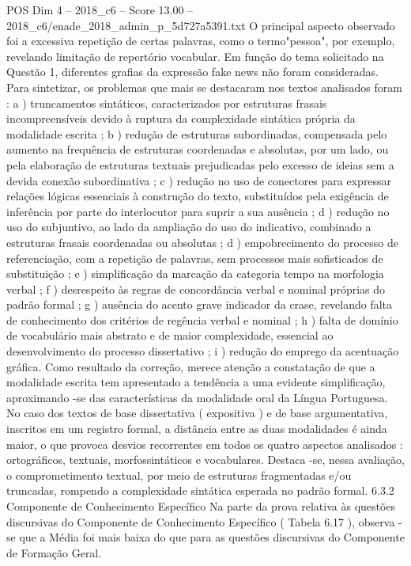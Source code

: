 \begin{textsample}{POS Dim 4 – 2018\_c6 – Score 13.00 – 2018\_c6/enade\_2018\_admin\_p\_5d727a5391.txt}
O principal aspecto observado foi a excessiva repetição de certas palavras, como o termo"pessoa", por exemplo, revelando limitação de repertório vocabular.
Em função do tema solicitado na Questão 1, diferentes grafias da expressão fake news não foram consideradas.
Para sintetizar, os problemas que mais se destacaram nos textos analisados foram : a ) truncamentos sintáticos, caracterizados por estruturas frasais incompreensíveis devido à ruptura da complexidade sintática própria da modalidade escrita ; b ) redução de estruturas subordinadas, compensada pelo aumento na frequência de estruturas coordenadas e absolutas, por um lado, ou pela elaboração de estruturas textuais prejudicadas pelo excesso de ideias sem a devida conexão subordinativa ; c ) redução no uso de conectores para expressar relações lógicas essenciais à construção do texto, substituídos pela exigência de inferência por parte do interlocutor para suprir a sua ausência ; d ) redução no uso do subjuntivo, ao lado da ampliação do uso do indicativo, combinado a estruturas frasais coordenadas ou absolutas ; d ) empobrecimento do processo de referenciação, com a repetição de palavras, sem processos mais sofisticados de substituição ; e ) simplificação da marcação da categoria tempo na morfologia verbal ; f ) desrespeito às regras de concordância verbal e nominal próprias do padrão formal ; g ) ausência do acento grave indicador da crase, revelando falta de conhecimento dos critérios de regência verbal e nominal ; h ) falta de domínio de vocabulário mais abstrato e de maior complexidade, essencial ao desenvolvimento do processo dissertativo ; i ) redução do emprego da acentuação gráfica.
Como resultado da correção, merece atenção a constatação de que a modalidade escrita tem apresentado a tendência a uma evidente simplificação, aproximando -se das características da modalidade oral da Língua Portuguesa.
No caso dos textos de base dissertativa ( expositiva ) e de base argumentativa, inscritos em um registro formal, a distância entre as duas modalidades é ainda maior, o que provoca desvios recorrentes em todos os quatro aspectos analisados : ortográficos, textuais, morfossintáticos e vocabulares.
Destaca -se, nessa avaliação, o comprometimento textual, por meio de estruturas fragmentadas e/ou truncadas, rompendo a complexidade sintática esperada no padrão formal. 6.3.2 Componente de Conhecimento Específico Na parte da prova relativa às questões discursivas do Componente de Conhecimento Específico ( Tabela 6.17 ), observa -se que a Média foi mais baixa do que para as questões discursivas do Componente de Formação Geral.

\end{textsample}
